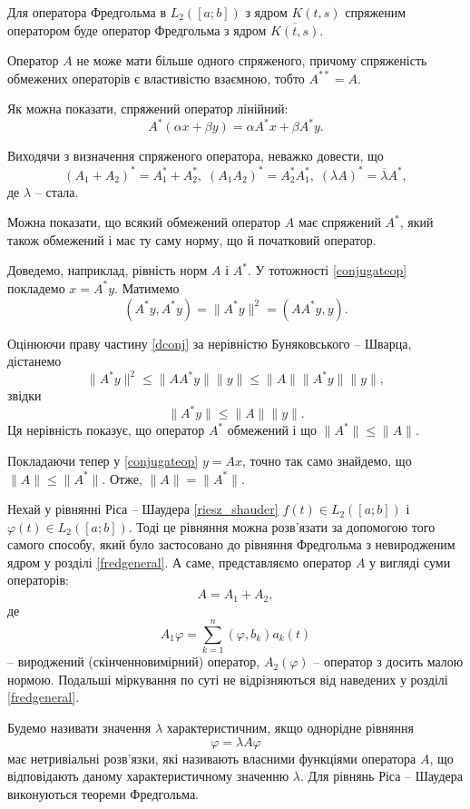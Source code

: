 \documentclass[14pt,twoside]{extreport}
\theoremstyle{mystyle}
\numberwithin{equation}{chapter}
\begin{document}
Для оператора Фредгольма в $L_2([a; b])$ з ядром $K(t, s)$ спряженим оператором буде оператор Фредгольма з ядром $\overline{K(t, s)}$.

Оператор $A$ не може мати більше одного спряженого, причому спряженість обмежених операторів є властивістю взаємною, тобто $A^{**} = A$.

Як можна показати, спряжений оператор лінійний:
\[
A^{*}(\alpha x + \beta y) = \alpha A^{*}x + \beta A^{*} y.
\]

Виходячи з визначення спряженого оператора, неважко довести, що
\[
(A_1 + A_2)^{*} = A_1^{*} + A_2^{*}, \; (A_1A_2)^{*} = A_2^{*}A_1^{*}, \; (\lambda A)^{*} = \overline{\lambda} A^{*},
\]
де $\lambda$ -- стала.

Можна показати, що всякий обмежений оператор $A$ має спряжений $A^{*}$, який також обмежений і має ту саму норму, що й початковий оператор.

Доведемо, наприклад, рівність норм $A$ і $A^{*}$. У тотожності \eqref{conjugateop} покладемо $x=A^{*}y$. Матимемо
\begin{equation}\label{dconj}
(A^*y, A^*y) = \|A^* y\|^2 = (AA^*y, y).
\end{equation}

Оцінюючи праву частину \eqref{dconj} за нерівністю Буняковського -- Шварца, дістанемо
\[
\|A^*y\|^2 \leqslant \|AA^*y\| \|y\| \leqslant \|A\| \|A^*y\| \|y\|,
\]
звідки
\[
\|A^*y\| \leqslant \|A\| \|y\|.
\]
Ця нерівність показує, що оператор $A^*$ обмежений і що $\|A^*\| \leqslant \|A\|$.

Покладаючи тепер у \eqref{conjugateop} $y = Ax$, точно так само знайдемо, що $\|A\| \leqslant \|A^*\|$. Отже, $\|A\| = \|A^*\|$.

Нехай у рівнянні Ріса -- Шаудера \eqref{riesz_shauder} $f(t) \in L_2([a; b])$ і $\varphi(t) \in L_2([a; b])$. Тоді це рівняння можна розв'язати за допомогою того самого способу, який було застосовано до рівняння Фредгольма з невиродженим ядром у розділі \ref{fredgeneral}. А саме, представляємо оператор $A$ у вигляді суми операторів:
\[
A=A_1+A_2,
\]
де
\[
A_1\varphi = \sum_{k=1}^{n} (\varphi, b_k) a_k(t)
\]
-- вироджений (скінченновимірний) оператор, $A_2(\varphi)$ -- оператор з досить малою нормою. Подальші міркування по суті не відрізняються від наведених у розділі \ref{fredgeneral}.

Будемо називати значення $\lambda$ характеристичним, якщо однорідне рівняння
\[
\varphi = \lambda A \varphi
\]
має нетривіальні розв'язки, які називають власними функціями оператора $A$, що відповідають даному характеристичному значенню $\lambda$. Для рівнянь Ріса -- Шаудера виконуються теореми Фредгольма.
\end{document}
